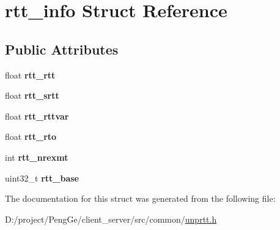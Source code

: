 \hypertarget{structrtt__info}{}\section{rtt\+\_\+info Struct Reference}
\label{structrtt__info}
\subsection*{Public Attributes}
\begin{DoxyCompactItemize}
\item 
\hypertarget{structrtt__info_a63cf11310859ddccb8927225f3547b30}{}float {\bfseries rtt\+\_\+rtt}\label{structrtt__info_a63cf11310859ddccb8927225f3547b30}

\item 
\hypertarget{structrtt__info_a10236c8eb80b30f1d37d44ccc449eddb}{}float {\bfseries rtt\+\_\+srtt}\label{structrtt__info_a10236c8eb80b30f1d37d44ccc449eddb}

\item 
\hypertarget{structrtt__info_a606ee3fa94939f59b7bde1623de059c9}{}float {\bfseries rtt\+\_\+rttvar}\label{structrtt__info_a606ee3fa94939f59b7bde1623de059c9}

\item 
\hypertarget{structrtt__info_a4872c2830891ce21535646376c4311cf}{}float {\bfseries rtt\+\_\+rto}\label{structrtt__info_a4872c2830891ce21535646376c4311cf}

\item 
\hypertarget{structrtt__info_a19ec3e43f0bff53ea5a0d39025b7f9ae}{}int {\bfseries rtt\+\_\+nrexmt}\label{structrtt__info_a19ec3e43f0bff53ea5a0d39025b7f9ae}

\item 
\hypertarget{structrtt__info_a552a6d4f8a5c78271145b30e31a72630}{}uint32\+\_\+t {\bfseries rtt\+\_\+base}\label{structrtt__info_a552a6d4f8a5c78271145b30e31a72630}

\end{DoxyCompactItemize}


The documentation for this struct was generated from the following file\+:\begin{DoxyCompactItemize}
\item 
D\+:/project/\+Peng\+Ge/client\+\_\+server/src/common/\hyperlink{unprtt_8h}{unprtt.\+h}\end{DoxyCompactItemize}

